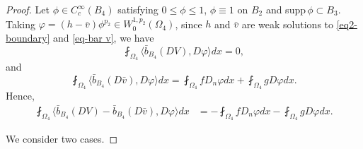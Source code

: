 \documentclass[a4paper,10pt]{amsart}
\newcommand{\Om}{\Omega}
\newcommand{\vc}{\infty}
\begin{document}
\begin{proof}
Let $\phi\in C^\vc_c(B_{4})$ satisfying $0\leq \phi\leq 1$, $\phi\equiv 1$ on $B_{2}$ and  supp\,$\phi\subset B_{3}$. Taking $\varphi=(h-\bar{v})\phi^{p_2}\in W^{1,p_2}_0(\Om_{4 })$, since $h$ and $\bar{v}$ are weak solutions to \eqref{eq2-boundary} and \eqref{eq-bar v},  we have
$$
\fint_{\Om_{4}}\langle \bar{b}_{B_4}(DV),D\varphi\rangle dx= 0,
$$
and
$$
\fint_{\Om_{4 }}\langle \bar{b}_{B_4}(D\bar{v}),D\varphi\rangle dx= \fint_{\Om_{4 }} fD_n\varphi dx+\fint_{\Om_{4}} gD\varphi dx.
$$
Hence,
$$
\begin{aligned}
\fint_{\Om_{4}}\langle \bar{b}_{B_4}(DV)-\bar{b}_{B_4}(D{\bar{v}}),D\varphi\rangle dx&= -\fint_{\Om_{4}} fD_n\varphi dx-\fint_{\Om_{4 }} gD\varphi dx.
\end{aligned}
$$

We consider two cases.


\end{proof}
\end{document}
